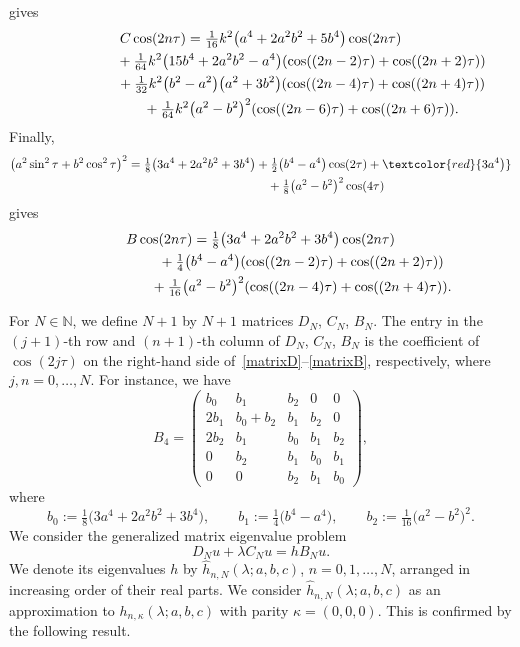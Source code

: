 \documentclass[pdftex]{sigma}
\newcommand{\RS}[1]{\textcolor{red}{#1}}
\newcommand{\N}{\mathbb{N}}
\numberwithin{equation}{section}
\begin{document}
gives
\begin{gather}
 C\cos(2n\tau)=
 \tfrac1{16} k^2\bigl(a^4+2a^2b^2+5b^4\bigr)\cos(2n\tau)\nonumber\\ \hphantom{ C\cos(2n\tau)=}{}
 +\tfrac1{64} k^2\bigl(15b^4+2a^2b^2-a^4\bigr)(\cos((2n-2)\tau)+\cos((2n+2)\tau))\nonumber\\ \hphantom{ C\cos(2n\tau)=}{}
 +\tfrac1{32} k^2 \bigl(b^2-a^2\bigr)\bigl(a^2+3b^2\bigr)(\cos((2n-4)\tau)+\cos((2n+4)\tau))\nonumber\\ \hphantom{ C\cos(2n\tau)=}{}
 +\tfrac1{64} k^2 \bigl(a^2-b^2\bigr)^2 (\cos((2n-6)\tau)+\cos((2n+6)\tau)).\label{matrixC}
\end{gather}
Finally,
\begin{gather*}
\bigl(a^2\sin^2\tau+b^2\cos^2\tau\bigr)^2 =\tfrac18\bigl(3a^4+2a^2b^2+3b^4\bigr)+\tfrac12\bigl(b^4-a^4\bigr)\cos(2\tau)+ \RS{3a^4\bigr)}\\
\hphantom{\bigl(a^2\sin^2\tau+b^2\cos^2\tau\bigr)^2 =}{}
+\tfrac18\bigl(a^2-b^2\bigr)^2\cos(4\tau)
\end{gather*}
gives
\begin{gather}
B\cos(2n\tau)=
 \tfrac18\bigl(3a^4+2a^2b^2+3b^4\bigr)\cos(2n\tau)\nonumber\\ \hphantom{B\cos(2n\tau)=}{}
 +\tfrac14\bigl(b^4-a^4\bigr) (\cos((2n-2)\tau)+\cos((2n+2)\tau))\nonumber\\ \hphantom{B\cos(2n\tau)=}{}
 +\tfrac1{16}\bigl(a^2-b^2\bigr)^2 (\cos((2n-4)\tau)+\cos((2n+4)\tau)).\label{matrixB}
\end{gather}

For $N\in\N$, we define $N+1$ by $N+1$ matrices $D_N$, $C_N$, $B_N$.
The entry in the $(j+1)$-th row and $(n+1)$-th column of $D_N$, $C_N$, $B_N$ is the coefficient of $\cos(2j\tau)$ on the right-hand side of~\eqref{matrixD}--\eqref{matrixB}, respectively, where $j,n=0,\dots,N$.
For instance, we have
\[ B_4=\begin{pmatrix} b_0 & b_1 & b_2 & 0 &0\\ 2b_1 & b_0+b_2 & b_1 & b_2 &0 \\
2b_2 & b_1 & b_0 & b_1&b_2 \\
0 & b_2 & b_1 & b_0 &b_1\\
0 & 0 & b_2 & b_1 & b_0
\end{pmatrix},\]
where
\[ b_0:=\tfrac18\bigl(3a^4+2a^2b^2+3b^4\bigr),\qquad b_1:=\tfrac14\bigl(b^4-a^4\bigr),\qquad b_2:=\tfrac1{16}\bigl(a^2-b^2\bigr)^2 .\]
We consider the generalized matrix eigenvalue problem
\begin{equation*}%
 D_N u+\lambda C_Nu= h B_N u.
 \end{equation*}
We denote its eigenvalues $h$ by $\hat h_{n,N}(\lambda;a,b,c)$, $n=0,1,\dots,N$, arranged in increasing order of their
real parts. We consider $\hat h_{n,N}(\lambda;a,b,c)$ as an approximation to $h_{n,\kappa}(\lambda;a,b,c)$
with parity $\kappa=(0,0,0)$. This is confirmed by the following result.
\end{document}
